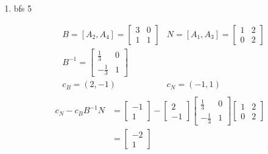 \documentclass[11pt]{article}
\begin{document}
\begin{enumerate}
    \item bfs 5\par
    \begin{align*}
        & B = [A_2, A_4]=\begin{bmatrix} 3 & 0 \\ 1 & 1\end{bmatrix} & N = [A_1, A_3]=\begin{bmatrix} 1 & 2 \\ 0 & 2\end{bmatrix}\\
        & B^{-1} = \begin{bmatrix} \frac{1}{3} &  0 \\ -\frac{1}{3} & 1 \end{bmatrix} & \\
        & c_B = (2, -1) & c_N =(-1,1)\\
    \end{align*}
    \begin{align*}
         c_N - c_B B^{-1}N &=  \begin{bmatrix} -1 \\ 1 \end{bmatrix}  - \begin{bmatrix} 2 \\ -1 \end{bmatrix} \begin{bmatrix} \frac{1}{3} &  0 \\ -\frac{1}{3} & 1 \end{bmatrix} \begin{bmatrix} 1 & 2 \\ 0 & 2\end{bmatrix}\\
        &= \begin{bmatrix} -2 \\ 1 \end{bmatrix}
    \end{align*}
    

\end{enumerate}
\end{document}
